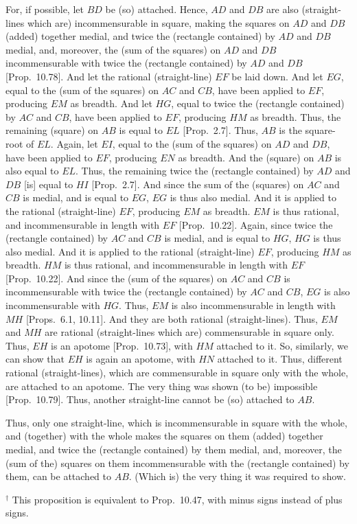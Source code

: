 \begin{Parallel}{}{}
{For, if possible, let $BD$ be (so) attached. Hence, $AD$ and
$DB$ are also (straight-lines which are) incommensurable in square, making the
squares on $AD$ and $DB$ (added) together medial, and twice the (rectangle contained) by $AD$ and $DB$ medial, and, moreover, the (sum of the squares)
on $AD$ and $DB$ incommensurable with twice the (rectangle contained)
by $AD$ and $DB$ [Prop.~10.78].
And let the rational (straight-line) $EF$ be laid down. And let $EG$, equal
to the (sum of the squares) on $AC$ and $CB$, have been applied to
$EF$, producing $EM$ as breadth. And let $HG$, equal to twice the (rectangle contained) by $AC$ and $CB$, have been applied to $EF$, producing $HM$ as breadth. Thus, the remaining (square) on  $AB$ is equal
to $EL$ [Prop.~2.7].  Thus, $AB$ is the square-root
of $EL$. Again, let $EI$, equal to the (sum of the squares) on $AD$ and $DB$, have been applied to $EF$, producing $EN$ as breadth. And the (square) on $AB$
 is also equal to $EL$. Thus, the remaining twice the
(rectangle contained) by $AD$ and $DB$ [is] equal to $HI$ [Prop.~2.7].  And since the sum of the (squares) on $AC$ and $CB$ is medial, and is equal to $EG$, $EG$ is thus also medial.
And it is applied to the rational (straight-line) $EF$, producing $EM$ as breadth. $EM$ is thus rational, and incommensurable in length with $EF$
[Prop.~10.22]. Again, since twice the
(rectangle contained) by $AC$ and $CB$ is medial, and is equal to $HG$,
$HG$ is thus also medial. And it is applied to the rational (straight-line) $EF$,
producing $HM$ as breadth. $HM$ is thus rational, and incommensurable in
length with $EF$ [Prop.~10.22]. 
And since the (sum of the squares) on
 $AC$ and $CB$ is incommensurable
with twice the (rectangle contained) by $AC$ and $CB$, $EG$ is also incommensurable with $HG$. Thus, $EM$ is also incommensurable in length
with $MH$ [Props.~6.1, 10.11]. And they are both  rational (straight-lines). Thus, $EM$ and $MH$ are rational (straight-lines which are) commensurable in square
only. Thus, $EH$ is an apotome [Prop.~10.73], with $HM$ attached to it. So, similarly, we can show that $EH$ is again an apotome, with $HN$ attached to it. Thus, different rational (straight-lines),
which are commensurable in square only with the whole, are attached to
an apotome. The very thing was shown (to be) impossible [Prop.~10.79]. Thus, another straight-line cannot
be (so) attached to $AB$.

Thus, only one straight-line, which is incommensurable
in square with the whole, and (together) with the whole makes the 
squares on them (added) together medial, and twice the (rectangle contained) by
them medial, and, moreover, the (sum of the)
squares on them incommensurable with the (rectangle contained)
by them, can be attached to $AB$. (Which is) the very thing it
was required to show.}
\end{Parallel}
{\footnotesize\noindent$^\dag$ This proposition is equivalent to 
Prop.~10.47, with minus signs instead of
plus signs.}

